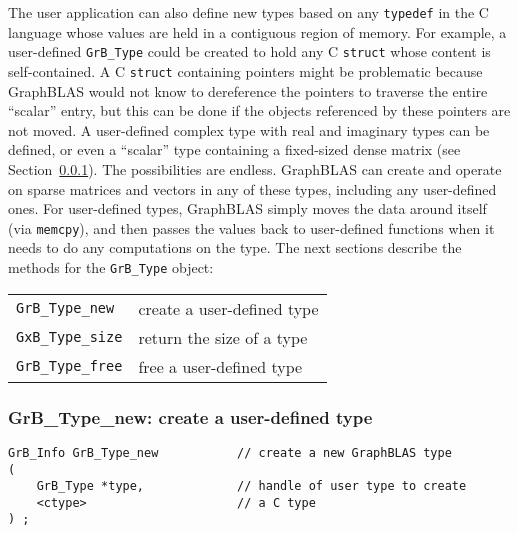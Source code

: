 \documentclass[12pt]{article}
\begin{document}
The user application can also define new types based on any \verb'typedef' in
the C language whose values are held in a contiguous region of memory.  For
example, a user-defined \verb'GrB_Type' could be created to hold any C
\verb'struct' whose content is self-contained.  A C \verb'struct' containing
pointers might be problematic because GraphBLAS would not know to dereference
the pointers to traverse the entire ``scalar'' entry, but this can be done if
the objects referenced by these pointers are not moved.  A user-defined complex
type with real and imaginary types can be defined, or even a ``scalar'' type
containing a fixed-sized dense matrix (see Section~\ref{type_new}).  The
possibilities are endless.  GraphBLAS can create and operate on sparse matrices
and vectors in any of these types, including any user-defined ones.  For
user-defined types, GraphBLAS simply moves the data around itself (via
\verb'memcpy'), and then passes the values back to user-defined functions when
it needs to do any computations on the type.  The next sections describe the
methods for the \verb'GrB_Type' object:

\vspace{0.2in}
{\footnotesize
\begin{tabular}{ll}
\hline
\verb'GrB_Type_new'      & create a user-defined type \\
\verb'GxB_Type_size'     & return the size of a type \\
\verb'GrB_Type_free'     & free a user-defined type \\
\hline
\end{tabular}
}
\vspace{0.2in}

\newpage
\subsubsection{{\sf GrB\_Type\_new:} create a user-defined type}
\label{type_new}

\begin{mdframed}[userdefinedwidth=6in]
{\footnotesize
\begin{verbatim}
GrB_Info GrB_Type_new           // create a new GraphBLAS type
(
    GrB_Type *type,             // handle of user type to create
    <ctype>                     // a C type
) ;
\end{verbatim}
}\end{mdframed}
\end{document}
